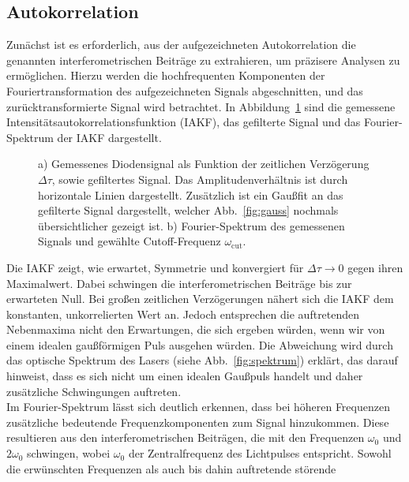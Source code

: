 \subsection{\label{sec:A1}Autokorrelation}
Zunächst ist es erforderlich, aus der aufgezeichneten Autokorrelation die genannten interferometrischen 
Beiträge zu extrahieren, um präzisere Analysen zu ermöglichen. Hierzu werden die hochfrequenten Komponenten 
der Fouriertransformation des aufgezeichneten Signals abgeschnitten, und das zurücktransformierte Signal wird 
betrachtet. In Abbildung~\ref{fig:A11} sind die gemessene Intensitätsautokorrelationsfunktion (IAKF), 
das gefilterte Signal und das Fourier-Spektrum der IAKF dargestellt.
\begin{figure}[h!]
    \centering
    \qquad
    \caption{\label{fig:A11}a) Gemessenes Diodensignal als Funktion der zeitlichen Verzögerung $\Delta\tau$,
    sowie gefiltertes Signal. Das Amplitudenverhältnis ist durch horizontale Linien 
    dargestellt. Zusätzlich ist ein Gaußfit an das gefilterte Signal 
    dargestellt, welcher Abb.~\ref{fig:gauss} nochmals übersichtlicher gezeigt ist. b) Fourier-Spektrum des gemessenen Signals und gewählte 
    Cutoff-Frequenz $\omega_{\text{cut}}$.}
\end{figure}\FloatBarrier
Die IAKF zeigt, wie erwartet, Symmetrie und konvergiert für $\Delta\tau \rightarrow 0$ gegen ihren Maximalwert. 
Dabei schwingen die interferometrischen Beiträge bis zur erwarteten Null. 
Bei großen zeitlichen Verzögerungen nähert sich die IAKF dem konstanten, unkorrelierten Wert an. 
Jedoch entsprechen die auftretenden Nebenmaxima nicht den Erwartungen, die sich ergeben würden, 
wenn wir von einem idealen gaußförmigen Puls ausgehen würden. Die Abweichung wird durch das 
optische Spektrum des Lasers (siehe Abb.~\ref{fig:spektrum}) erklärt, das darauf hinweist, 
dass es sich nicht um einen idealen Gaußpuls handelt und daher zusätzliche Schwingungen auftreten. \\
Im Fourier-Spektrum lässt sich deutlich erkennen, dass bei höheren Frequenzen zusätzliche bedeutende 
Frequenzkomponenten zum Signal hinzukommen. Diese resultieren aus den interferometrischen Beiträgen, 
die mit den Frequenzen $\omega_{0}$ und $2\omega_{0}$ schwingen, wobei $\omega_{0}$ der Zentralfrequenz 
des Lichtpulses entspricht. Sowohl die erwünschten Frequenzen als auch bis dahin auftretende störende 
